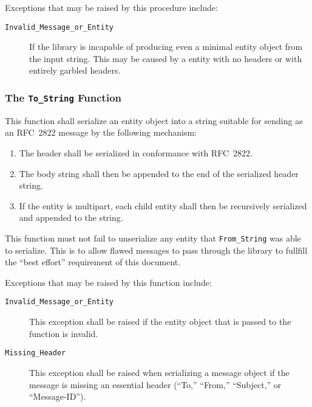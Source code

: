 \documentclass[11pt]{article}
\begin{document}
Exceptions that may be raised by this procedure include:

\begin{description}

\item[\texttt{Invalid\_Message\_or\_Entity}] If the library is
  incapable of producing even a minimal entity object from the input
  string. This may be caused by a entity with no headers or with
  entirely garbled headers.

\end{description}

\subsubsection{The \texttt{To\_String} Function}

This function shall serialize an entity object into a string suitable
for sending as an RFC~2822 message by the following mechanism:

\begin{enumerate}

\item The header shall be serialized in conformance with RFC~2822.

\item The body string shall then be appended to the end of the
  serialized header string.

\item If the entity is multipart, each child entity shall then be
  recursively serialized and appended to the string.

\end{enumerate}

This function must not fail to unserialize any entity that
\texttt{From\_String} was able to serialize. This is to allow
flawed messages to pass through the library to fullfill the ``best
effort'' requirement of this document.

Exceptions that may be raised by this function include:

\begin{description}

\item[\texttt{Invalid\_Message\_or\_Entity}] This exception shall be
  raised if the entity object that is passed to the function is invalid.

\item[\texttt{Missing\_Header}]This exception shall be raised when
  serializing a message object if the message is missing an essential
  header (``To,'' ``From,'' ``Subject,'' or ``Message-ID'').

\end{description}
\end{document}
